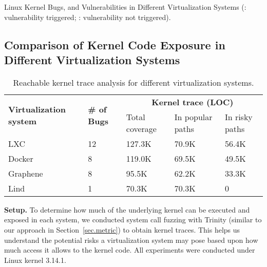 {{{\begin{table}[h]
\caption {\small Linux Kernel Bugs, and Vulnerabilities in Different Virtualization Systems
({\color{red}}: vulnerability triggered;
: vulnerability not triggered).}

\label{table:trigger_vulnerabilities}
\end{table}

\subsection{Comparison of Kernel Code Exposure in Different Virtualization
Systems}
\label{Reachable-Kernel-Trace-Analysis-for-Different-Virtualization-Systems}
\begin{table}
\centering
\scriptsize
\begin{tabular}{|l|l|l|l|l|}
  \hline
  \multirow{3}{1.5cm}{\bf Virtualization system} & \multirow{3}{0.5cm}{\bf \# of Bugs} & \multicolumn{3}{c|}{\bf Kernel trace (LOC)} \\ \cline{3-5}
  & & \multirow{2}{1.2cm}{Total coverage} & \multirow{2}{1.2cm}{In popular paths} & \multirow{2}{1.2cm}{In risky paths}  \\
  & & & & \\  \hline
  LXC & 12 & 127.3K & 70.9K & 56.4K \\
  \hline
  Docker & 8 & 119.0K & 69.5K & 49.5K \\
  \hline
  Graphene & 8 & 95.5K & 62.2K & 33.3K \\
  \hline
  Lind & 1 & 70.3K & 70.3K & 0 \\
  \hline
\end{tabular}
\caption{\small Reachable kernel trace analysis for different virtualization
systems.}
\label{table:trace-systems}
\end{table}


\noindent
\textbf{Setup.}
To determine how much of the underlying kernel can be executed and exposed in
each system,
we conducted system call fuzzing with Trinity (similar to our approach in
Section~{\ref{sec.metric}}) to obtain
kernel traces. This helps us understand the potential risks a virtualization system
may pose based upon how much access it allows to the kernel code.
All experiments were conducted under Linux kernel 3.14.1.

}}}
